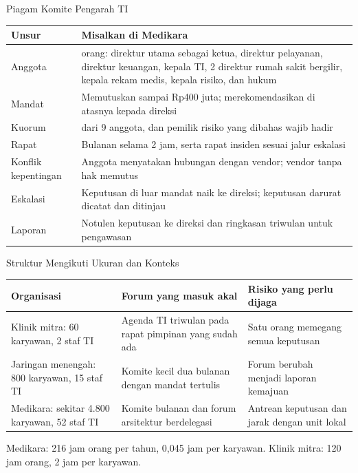 \documentclass[aspectratio=169, table, 12pt]{beamer}
\begin{document}
\begin{frame}{{\Large Piagam Komite Pengarah TI}}
  \vspace{2pt}
  \footnotesize
  \renewcommand{\arraystretch}{1.15}
  \begin{tabularx}{\textwidth}{|>{\raggedright\arraybackslash}p{}|>{\raggedright\arraybackslash}X|}
    \hline
    \textbf{Unsur} & \textbf{Misalkan di Medikara} \\ \hline
    Anggota & 9 orang: direktur utama sebagai ketua, direktur pelayanan, direktur keuangan, kepala TI, 2
    direktur rumah sakit bergilir, kepala rekam medis, kepala risiko, dan hukum \\ \hline
    Mandat & Memutuskan sampai Rp400 juta; merekomendasikan di atasnya kepada direksi \\ \hline
    Kuorum & 6 dari 9 anggota, dan pemilik risiko yang dibahas wajib hadir \\ \hline
    Rapat & Bulanan selama 2 jam, serta rapat insiden sesuai jalur eskalasi \\ \hline
    Konflik kepentingan & Anggota menyatakan hubungan dengan vendor; vendor tanpa hak memutus \\ \hline
    Eskalasi & Keputusan di luar mandat naik ke direksi; keputusan darurat dicatat dan ditinjau \\ \hline
    Laporan & Notulen keputusan ke direksi dan ringkasan triwulan untuk pengawasan \\ \hline
  \end{tabularx}
\end{frame}

\begin{frame}{{\Large Struktur Mengikuti Ukuran dan Konteks}}
  \vspace{4pt}
  \footnotesize
  \begin{tabularx}{\textwidth}{|>{\raggedright\arraybackslash}p{}|>{\raggedright\arraybackslash}X|>{\raggedright\arraybackslash}X|}
    \hline
    \textbf{Organisasi} & \textbf{Forum yang masuk akal} & \textbf{Risiko yang perlu dijaga} \\ \hline
    Klinik mitra: 60 karyawan, 2 staf TI & Agenda TI triwulan pada rapat pimpinan yang sudah ada & Satu
    orang memegang semua keputusan \\ \hline
    Jaringan menengah: 800 karyawan, 15 staf TI & Komite kecil dua bulanan dengan mandat tertulis & Forum
    berubah menjadi laporan kemajuan \\ \hline
    Medikara: sekitar 4.800 karyawan, 52 staf TI & Komite bulanan dan forum arsitektur berdelegasi &
    Antrean keputusan dan jarak dengan unit lokal \\ \hline
  \end{tabularx}

  \vspace{6pt}
  \small Medikara: 216 jam orang per tahun, 0,045 jam per karyawan. Klinik mitra: 120 jam orang, 2 jam
  per karyawan.
\end{frame}
\end{document}
